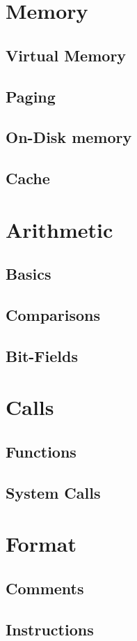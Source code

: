 \documentclass{scrartcl}
\begin{document}
    \section{Memory}
        \subsection{Virtual Memory}
        \subsection{Paging}
        \subsection{On-Disk memory}
        \subsection{Cache}
    \section{Arithmetic}
        \subsection{Basics}
        \subsection{Comparisons}
        \subsection{Bit-Fields}
    \section{Calls}
        \subsection{Functions}
        \subsection{System Calls}
    \section{Format}
        \subsection{Comments}
        \subsection{Instructions}
\end{document}
